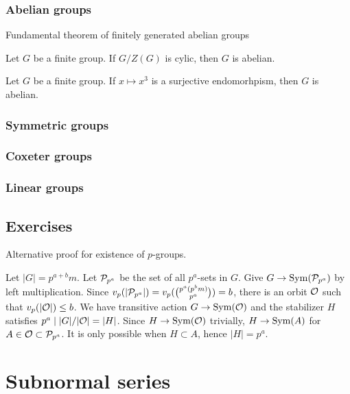 \documentclass{../note}
\begin{document}
\subsection{Abelian groups}
Fundamental theorem of finitely generated abelian groups

\begin{thm}
Let $G$ be a finite group.
If $G/Z(G)$ is cylic, then $G$ is abelian.
\end{thm}
\begin{thm}
Let $G$ be a finite group.
If $x\mapsto x^3$ is a surjective endomorhpism, then $G$ is abelian.
\end{thm}

\subsection{Symmetric groups}
\subsection{Coxeter groups}
\subsection{Linear groups}






\section*{Exercises}
\begin{prb}
Alternative proof for existence of $p$-groups.
\end{prb}
\begin{pf}
Let $|G|=p^{a+b}m$.
Let $\mathcal{P}_{p^a}$ be the set of all $p^a$-sets in $G$.
Give $G\to\operatorname{Sym}(\mathcal{P}_{p^a})$ by left multiplication.
Since $v_p(|\mathcal{P}_{p^a}|)=v_p(\binom{p^a(p^bm)}{p^a})=b$, there is an orbit $\mathcal{O}$ such that $v_p(|\mathcal{O}|)\le b$.
We have transitive action $G\to\operatorname{Sym}(\mathcal{O})$ and the stabilizer $H$ satisfies $p^a\mid|G|/|\mathcal{O}|=|H|$.
Since $H\to\operatorname{Sym}(\mathcal{O})$ trivially, $H\to\operatorname{Sym}(A)$ for $A\in\mathcal{O}\subset\mathcal{P}_{p^a}$.
It is only possible when $H\subset A$, hence $|H|=p^a$.
\end{pf}




\chapter{Subnormal series}
\end{document}
